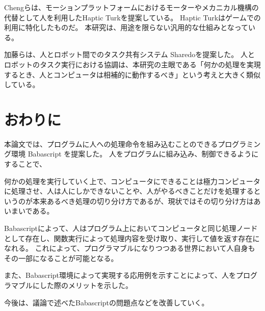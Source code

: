 Chengらは、モーションプラットフォームにおけるモーターやメカニカル機構の代替として人を利用したHaptic
Turkを提案している\cite{hapticturk}。 Haptic
Turkはゲームでの利用に特化したものだ。
本研究は、用途を限らない汎用的な仕組みとなっている。

加藤らは、人とロボット間でのタスク共有システム
Sharedoを提案した\cite{sharedo}。
人とロボットのタスク実行における協調は、本研究の主眼である「何かの処理を実現するとき、人とコンピュータは相補的に動作するべき」という考えと大きく類似している。

\section{おわりに}\label{ux304aux308fux308aux306b}

本論文では、プログラムに人への処理命令を組み込むことのできるプログラミング環境
Babascript を提案した。
人をプログラムに組み込み、制御できるようにすることで、

何かの処理を実行していく上で、コンピュータにできることは極力コンピュータに処理させ、人は人にしかできないことや、人がやるべきことだけを処理するというのが本来あるべき処理の切り分け方であるが、現状ではその切り分け方はあいまいである。

Babascriptによって、人はプログラム上においてコンピュータと同じ処理ノードとして存在し、関数実行によって処理内容を受け取り、実行して値を返す存在になれる。
これによって、プログラマブルになりつつある世界において人自身もその一部になることが可能となる。

また、Babascript環境によって実現する応用例を示すことによって、人をプログラマブルにした際のメリットを示した。

今後は、議論で述べたBabascriptの問題点などを改善していく。
